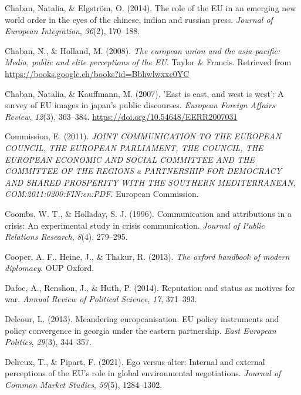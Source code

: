 \documentclass[
  letterpaper,
  DIV=11,
  numbers=noendperiod]{scrartcl}
\newlength{\cslhangindent}
\newenvironment{CSLReferences}[2] %
 {\begin{list}{}{%
  \setlength{\itemindent}{0pt}
  \setlength{\leftmargin}{0pt}
  \setlength{\parsep}{0pt}
  \ifodd #1
   \setlength{\leftmargin}{\cslhangindent}
   \setlength{\itemindent}{-1\cslhangindent}
  \fi
  \setlength{\itemsep}{#2\baselineskip}}}
 {\end{list}}
\begin{document}
\begin{CSLReferences}{1}{0}
Chaban, Natalia, \& Elgström, O. (2014). The role of the EU in an
emerging new world order in the eyes of the chinese, indian and russian
press. \emph{Journal of European Integration}, \emph{36}(2), 170--188.

Chaban, N., \& Holland, M. (2008). \emph{The european union and the
asia-pacific: Media, public and elite perceptions of the EU}. Taylor \&
Francis. Retrieved from
\url{https://books.google.ch/books?id=Bbhwlwxxc0YC}

Chaban, Natalia, \& Kauffmann, M. (2007). 'East is east, and west is
west': A survey of {EU} images in japan's public discourses.
\emph{European Foreign Affairs Review}, \emph{12}(3), 363--384.
\url{https://doi.org/10.54648/EERR2007031}

Commission, E. (2011). \emph{JOINT COMMUNICATION TO THE EUROPEAN
COUNCIL, THE EUROPEAN PARLIAMENT, THE COUNCIL, THE EUROPEAN ECONOMIC AND
SOCIAL COMMITTEE AND THE COMMITTEE OF THE REGIONS a PARTNERSHIP FOR
DEMOCRACY AND SHARED PROSPERITY WITH THE SOUTHERN MEDITERRANEAN,
COM:2011:0200:FIN:en:PDF}. European Commission.

Coombs, W. T., \& Holladay, S. J. (1996). Communication and attributions
in a crisis: An experimental study in crisis communication.
\emph{Journal of Public Relations Research}, \emph{8}(4), 279--295.

Cooper, A. F., Heine, J., \& Thakur, R. (2013). \emph{The oxford
handbook of modern diplomacy}. OUP Oxford.

Dafoe, A., Renshon, J., \& Huth, P. (2014). Reputation and status as
motives for war. \emph{Annual Review of Political Science}, \emph{17},
371--393.

Delcour, L. (2013). Meandering europeanisation. EU policy instruments
and policy convergence in georgia under the eastern partnership.
\emph{East European Politics}, \emph{29}(3), 344--357.

Delreux, T., \& Pipart, F. (2021). Ego versus alter: Internal and
external perceptions of the EU's role in global environmental
negotiations. \emph{Journal of Common Market Studies}, \emph{59}(5),
1284--1302.


\end{CSLReferences}
\end{document}
